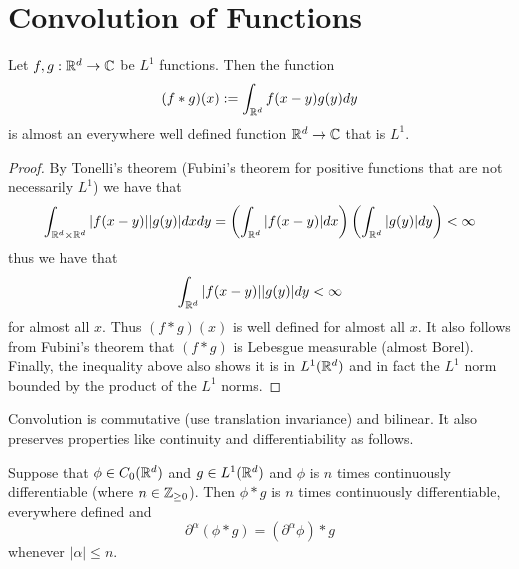\documentclass[twoside, a4paper, 10pt]{amsart}
\begin{document}
\section{Convolution of Functions}

\begin{prop}\label{prop: convolution of L1 is L1} Let $f,g:\mathbb{R}^d \to \mathbb{C}$ be $L^1$ functions. Then the function $$(f * g) (x) := \int_{\mathbb{R}^d} f(x-y)g(y) dy$$ is almost an everywhere well defined function $\mathbb{R}^d \to \mathbb{C}$ that is $L^1$.

\end{prop}

\begin{proof} By Tonelli's theorem (Fubini's theorem for positive functions that are not necessarily $L^1$) we have that $$\int_{\mathbb{R}^d \times \mathbb{R}^d} |f(x-y)||g(y)|dx dy = \left(\int_{\mathbb{R}^d} |f(x-y)| dx \right) \left( \int_{\mathbb{R}^d} |g(y)| dy \right) < \infty$$ thus we have that $$\int_{\mathbb{R}^d} |f(x-y)||g(y)| dy < \infty$$ for almost all $x$. Thus $(f*g)(x)$ is well defined for almost all $x$. It also follows from Fubini's theorem that $(f*g)$ is Lebesgue measurable (almost Borel). Finally, the inequality above also shows it is in $L^1(\mathbb{R}^d)$ and in fact the $L^1$ norm bounded by the product of the $L^1$ norms. \end{proof}

Convolution is commutative (use translation invariance) and bilinear. It also preserves properties like continuity and differentiability as follows.

\begin{prop} Suppose that $\phi \in C_0(\mathbb{R}^d)$ and $ g \in L^1(\mathbb{R}^d)$ and $\phi$ is $n$ times continuously differentiable (where $n \in \mathbb{Z}_{\geq 0}$). Then $\phi*g$ is $n$ times continuously differentiable, everywhere defined and $$\partial^{\alpha} (\phi * g) = (\partial^{\alpha} \phi) * g$$ whenever $|\alpha|\leq n$.

\end{prop}
\end{document}
